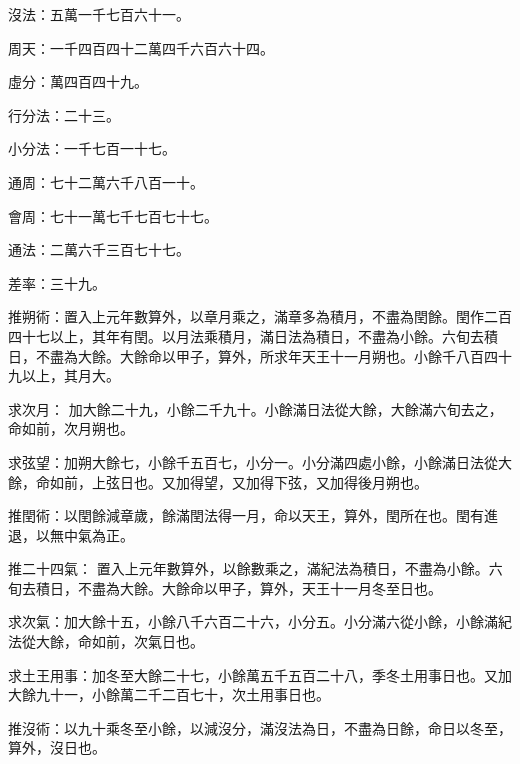 \begin{pinyinscope}
 沒法：五萬一千七百六十一。



 周天：一千四百四十二萬四千六百六十四。



 虛分：萬四百四十九。



 行分法：二十三。



 小分法：一千七百一十七。



 通周：七十二萬六千八百一十。



 會周：七十一萬七千七百七十七。



 通法：二萬六千三百七十七。



 差率：三十九。



 推朔術：置入上元年數算外，以章月乘之，滿章多為積月，不盡為閏餘。閏作二百四十七以上，其年有閏。以月法乘積月，滿日法為積日，不盡為小餘。六旬去積日，不盡為大餘。大餘命以甲子，算外，所求年天王十一月朔也。小餘千八百四十九以上，其月大。



 求次月：
 加大餘二十九，小餘二千九十。小餘滿日法從大餘，大餘滿六旬去之，命如前，次月朔也。



 求弦望：加朔大餘七，小餘千五百七，小分一。小分滿四處小餘，小餘滿日法從大餘，命如前，上弦日也。又加得望，又加得下弦，又加得後月朔也。



 推閏術：以閏餘減章歲，餘滿閏法得一月，命以天王，算外，閏所在也。閏有進退，以無中氣為正。



 推二十四氣：
 置入上元年數算外，以餘數乘之，滿紀法為積日，不盡為小餘。六旬去積日，不盡為大餘。大餘命以甲子，算外，天王十一月冬至日也。



 求次氣：加大餘十五，小餘八千六百二十六，小分五。小分滿六從小餘，小餘滿紀法從大餘，命如前，次氣日也。



 求土王用事：加冬至大餘二十七，小餘萬五千五百二十八，季冬土用事日也。又加大餘九十一，小餘萬二千二百七十，次土用事日也。



 推沒術：以九十乘冬至小餘，以減沒分，滿沒法為日，不盡為日餘，命日以冬至，算外，沒日也。




\end{pinyinscope}
